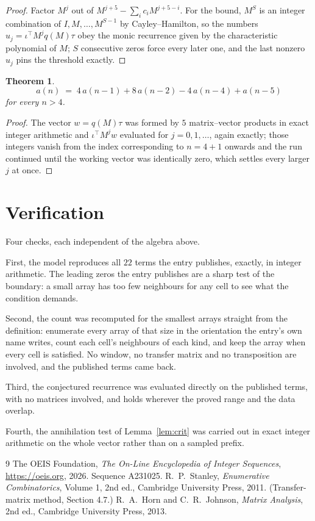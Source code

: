 \documentclass[11pt,a4paper]{article}
\theoremstyle{plain}
\newtheorem{theorem}{Theorem}
\theoremstyle{definition}
\begin{document}
\begin{proof}
Factor $M^{j}$ out of $M^{j+5}-\sum_ic_iM^{j+5-i}$. For the bound, $M^{S}$
is an integer combination of $I,M,\dots,M^{S-1}$ by Cayley--Hamilton, so the numbers
$u_j=\iota^{\!\top}M^{j}q(M)\tau$ obey the monic recurrence given by the characteristic
polynomial of $M$; $S$ consecutive zeros force every later one, and the last nonzero $u_j$
pins the threshold exactly.
\end{proof}

\begin{theorem}
\[
a(n)\;=\;4\,a(n-1) + 8\,a(n-2) - 4\,a(n-4) + a(n-5)
\]
for every $n>4$.
\end{theorem}

\begin{proof}
The vector $w=q(M)\tau$ was formed by $5$ matrix--vector products in exact integer
arithmetic and $\iota^{\!\top}M^{j}w$ evaluated for $j=0,1,\dots$, again exactly; those
integers vanish from the index corresponding to $n=4+1$ onwards and the run continued
until the working vector was identically zero, which settles every larger $j$ at once.
\end{proof}

\section{Verification}

Four checks, each independent of the algebra above.

First, the model reproduces all $22$ terms the entry publishes, exactly, in integer
arithmetic. The leading zeros the entry publishes are a sharp test of the boundary: a small
array has too few neighbours for any cell to see what the condition demands.

Second, the count was recomputed for the smallest arrays straight from the definition:
enumerate every array of that size in the orientation the entry's own name writes, count each
cell's neighbours of each kind, and keep the array when every cell is satisfied. No window, no
transfer matrix and no transposition are involved, and the published terms came back.

Third, the conjectured recurrence was evaluated directly on the published terms, with no
matrices involved, and holds wherever the proved range and the data overlap.

Fourth, the annihilation test of Lemma~\ref{lem:crit} was carried out in exact integer
arithmetic on the whole vector rather than on a sampled prefix.

\begin{thebibliography}{9}
 The OEIS Foundation, \emph{The On-Line Encyclopedia of Integer
Sequences}, \url{https://oeis.org}, 2026. Sequence A231025.
 R.~P.~Stanley, \emph{Enumerative Combinatorics}, Volume 1, 2nd ed.,
Cambridge University Press, 2011. (Transfer-matrix method, Section 4.7.)
 R.~A.~Horn and C.~R.~Johnson, \emph{Matrix Analysis}, 2nd ed., Cambridge
University Press, 2013.
\end{thebibliography}
\end{document}
